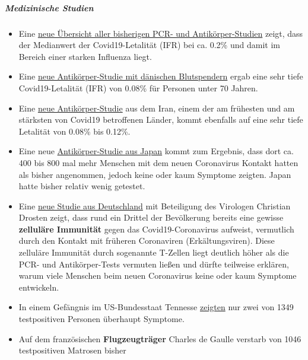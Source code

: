 \hypertarget{medizinische-studien}{%
\subparagraph{\texorpdfstring{\textbf{Medizinische
Studien}}{Medizinische Studien}}\label{medizinische-studien}}

\begin{itemize}
\tightlist
\item
  Eine \href{https://swprs.org/studies-on-covid-19-lethality/}{neue
  Übersicht aller bisherigen PCR- und Antikörper-Studien} zeigt, dass
  der Medianwert der Covid19-Letalität (IFR) bei ca. 0.2\% und damit im
  Bereich einer starken Influenza liegt.
\item
  Eine
  \href{https://www.medrxiv.org/content/10.1101/2020.04.24.20075291v1}{neue
  Antikörper-Studie mit dänischen Blutspendern} ergab eine sehr tiefe
  Covid19-Letalität (IFR) von 0.08\% für Personen unter 70 Jahren.
\item
  Eine
  \href{https://www.medrxiv.org/content/10.1101/2020.04.26.20079244v1}{neue
  Antikörper-Studie} aus dem Iran, einem der am frühesten und am
  stärksten von Covid19 betroffenen Länder, kommt ebenfalls auf eine
  sehr tiefe Letalität von 0.08\% bis 0.12\%.
\item
  Eine neue
  \href{https://www.medrxiv.org/content/10.1101/2020.04.26.20079822v1}{Antikörper-Studie
  aus Japan} kommt zum Ergebnis, dass dort ca. 400 bis 800 mal mehr
  Menschen mit dem neuen Coronavirus Kontakt hatten als bisher
  angenommen, jedoch keine oder kaum Symptome zeigten. Japan hatte
  bisher relativ wenig getestet.
\item
  Eine
  \href{https://www.medrxiv.org/content/10.1101/2020.04.17.20061440v1}{neue
  Studie aus Deutschland} mit Beteiligung des Virologen Christian
  Drosten zeigt, dass rund ein Drittel der Bevölkerung bereits eine
  gewisse \textbf{zelluläre Immunität} gegen das Covid19-Coronavirus
  aufweist, vermutlich durch den Kontakt mit früheren Coronaviren
  (Erkältungsviren). Diese zelluläre Immunität durch sogenannte T-Zellen
  liegt deutlich höher als die PCR- und Antikörper-Tests vermuten ließen
  und dürfte teilweise erklären, warum viele Menschen beim neuen
  Coronavirus keine oder kaum Symptome entwickeln.
\item
  In einem Gefängnis im US-Bundesstaat Tennesse
  \href{https://www.tennessean.com/story/news/politics/2020/05/01/tennessee-testing-all-inmates-prison-staff-after-multiple-outbreaks/3067388001/}{zeigten}
  nur zwei von 1349 testpositiven Personen überhaupt Symptome.
\item
  Auf dem französischen \textbf{Flugzeugträger} Charles de Gaulle
  verstarb von 1046 testpositiven Matrosen bisher

\end{itemize}

